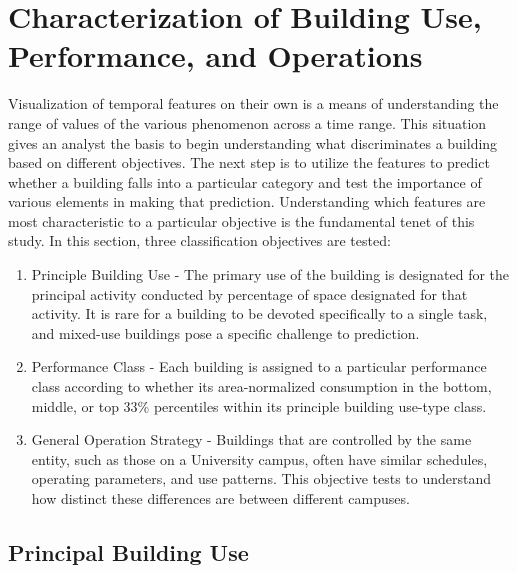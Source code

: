 
\chapter{Characterization of Building Use, Performance, and Operations}
\label{sec:characterization}

Visualization of temporal features on their own is a means of understanding the range of values of the various phenomenon across a time range. This situation gives an analyst the basis to begin understanding what discriminates a building based on different objectives. The next step is to utilize the features to predict whether a building falls into a particular category and test the importance of various elements in making that prediction. Understanding which features are most characteristic to a particular objective is the fundamental tenet of this study. In this section, three classification objectives are tested: 

\begin{enumerate}
\item Principle Building Use - The primary use of the building is designated for the principal activity conducted by percentage of space designated for that activity. It is rare for a building to be devoted specifically to a single task, and mixed-use buildings pose a specific challenge to prediction.
\item Performance Class - Each building is assigned to a particular performance class according to whether its area-normalized consumption in the bottom, middle, or top 33\% percentiles within its principle building use-type class.
\item General Operation Strategy - Buildings that are controlled by the same entity, such as those on a University campus, often have similar schedules, operating parameters, and use patterns. This objective tests to understand how distinct these differences are between different campuses.
\end{enumerate}

\section{Principal Building Use}
\label{sec:buildinguse}

